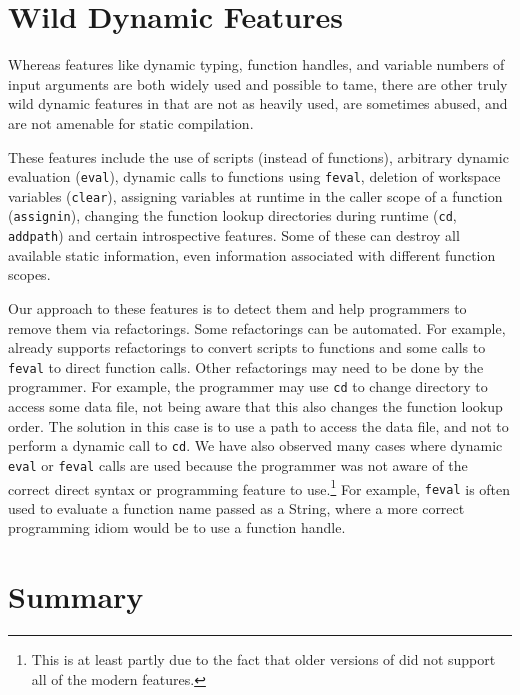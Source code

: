 \section{Wild Dynamic Features}

Whereas features like dynamic typing, function handles,  and variable numbers
of input arguments are both widely used and possible to tame,  there are other
truly wild dynamic features in \matlab that are not as heavily used, are
sometimes abused,  and are not amenable for static compilation.   





These features include the use of scripts (instead of functions), arbitrary
dynamic evaluation ({\tt eval}), dynamic calls to functions using {\tt feval},
deletion of workspace variables ({\tt clear}), assigning variables at runtime
in the caller scope of a function ({\tt assignin}), changing the function
lookup directories during runtime ({\tt cd}, {\tt addpath}) and certain introspective
features. Some of these can destroy all available static information, even
information associated with different function scopes.

Our approach to these features is to detect them and help programmers
to remove them via refactorings.  Some refactorings can be automated.  For
example, \mclab already supports refactorings to convert scripts to functions
and some calls to {\tt feval} to direct function calls\cite{SoroushThesis}.
Other refactorings may need to be done by the programmer.   For example, the
programmer may use {\tt cd} to change directory to access some data file,  not
being aware that this also changes the function lookup order.  The solution in
this case is to use a path to access the data file, and not to perform a
dynamic call to {\tt cd}.   We have also observed many cases where dynamic {\tt
eval} or {\tt feval} calls are used because the programmer was not aware of the
correct direct syntax or programming feature to use.\footnote{This is at least
partly due to the fact that older versions of \matlab did not support all of
the modern features.}   For example, {\tt feval} is often used to evaluate a
function name passed as a String, where a more correct programming idiom would
be to use a function handle.  

\section{Summary}

